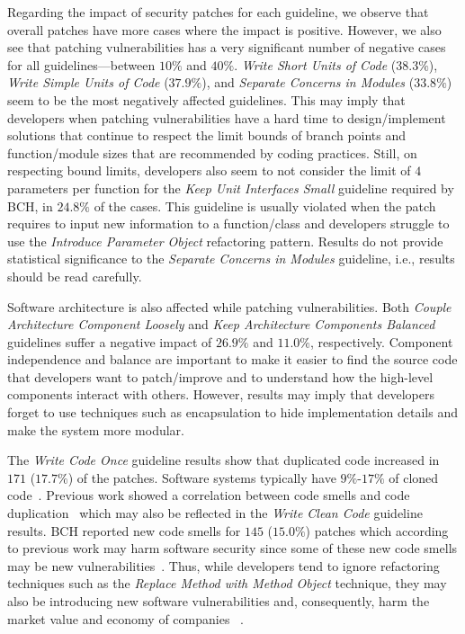 \documentclass[10pt,conference]{IEEEtran}
\begin{document}
Regarding the impact of security patches for each guideline, we observe
that overall patches have more cases where the impact is positive. However, 
we also see that patching vulnerabilities has a very
significant number of negative cases for all guidelines---between $10\%$ and $40\%$. 
\emph{Write Short Units of Code} ($38.3\%$), \emph{Write Simple Units of Code} 
($37.9\%$), and \emph{Separate Concerns in Modules} ($33.8\%$) seem to be the 
most negatively affected guidelines. This may imply that developers when patching 
vulnerabilities have a hard time to design/implement solutions that continue to 
respect the limit bounds of branch points and function/module sizes that are 
recommended by coding practices. Still, on 
respecting bound limits, developers also seem to not consider the limit 
of $4$ parameters per function for the \emph{Keep Unit Interfaces Small} 
guideline required by BCH, in $24.8\%$ of the cases. This guideline is usually
violated when the patch requires to input new information to a function/class 
and developers struggle to use the \emph{Introduce Parameter Object} refactoring 
pattern. Results do not provide statistical significance to the \emph{Separate 
Concerns in Modules} guideline, i.e., results should be read carefully. 


Software architecture is also affected while patching vulnerabilities.
Both \emph{Couple Architecture Component Loosely} and \emph{Keep
Architecture Components Balanced} guidelines suffer a negative impact of 
$26.9\%$ and $11.0\%$, respectively. Component independence and balance
are important to make it easier to find the source code that developers
want to patch/improve and to understand how the high-level components
interact with others. However, results may imply that developers
forget to use techniques such as encapsulation to hide implementation
details and make the system more modular.

The \emph{Write Code Once} guideline results show that duplicated code 
increased in $171$ ($17.7\%$) of the patches. Software systems typically have 
$9\%$-$17\%$ of cloned code~\cite{5773403}. Previous work showed a 
correlation between code smells and code duplication~\cite{7476787} 
which may also be reflected in the \emph{Write Clean Code} guideline results. 
BCH reported new code smells for $145$ ($15.0\%$) patches which according 
to previous work may harm software security since some of these new code
smells may be new vulnerabilities~\cite{8819456}.
Thus, while developers 
tend to ignore refactoring techniques such as the \emph{Replace Method 
with Method Object} technique, they may also be introducing new software 
vulnerabilities and, consequently, harm the market value and economy of companies
~\cite{4267025}.
\end{document}
